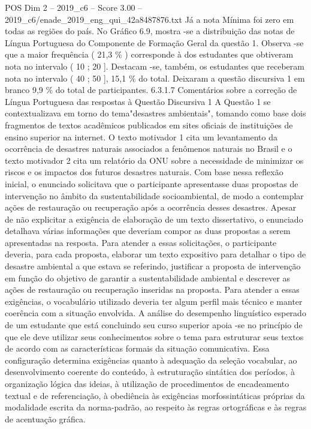 \begin{textsample}{POS Dim 2 – 2019\_c6 – Score 3.00 – 2019\_c6/enade\_2019\_eng\_qui\_42a8487876.txt}
Já a nota Mínima foi zero em todas as regiões do país.
No Gráfico 6.9, mostra -se a distribuição das notas de Língua Portuguesa do Componente de Formação Geral da questão 1.
Observa -se que a maior frequência ( 21,3 \% ) corresponde à dos estudantes que obtiveram nota no intervalo ( 10 ; 20 ].
Destacam -se, também, os estudantes que receberam nota no intervalo ( 40 ; 50 ], 15,1 \% do total.
Deixaram a questão discursiva 1 em branco 9,9 \% do total de participantes. 6.3.1.7 Comentários sobre a correção de Língua Portuguesa das respostas à Questão Discursiva 1 A Questão 1 se contextualizava em torno do tema"desastres ambientais", tomando como base dois fragmentos de textos acadêmicos publicados em sites oficiais de instituições de ensino superior na internet.
O texto motivador 1 cita um levantamento da ocorrência de desastres naturais associados a fenômenos naturais no Brasil e o texto motivador 2 cita um relatório da ONU sobre a necessidade de minimizar os riscos e os impactos dos futuros desastres naturais.
Com base nessa reflexão inicial, o enunciado solicitava que o participante apresentasse duas propostas de intervenção no âmbito da sustentabilidade socioambiental, de modo a contemplar ações de restauração ou recuperação após a ocorrência desses desastres.
Apesar de não explicitar a exigência de elaboração de um texto dissertativo, o enunciado detalhava várias informações que deveriam compor as duas propostas a serem apresentadas na resposta.
Para atender a essas solicitações, o participante deveria, para cada proposta, elaborar um texto expositivo para detalhar o tipo de desastre ambiental a que estava se referindo, justificar a proposta de intervenção em função do objetivo de garantir a sustentabilidade ambiental e descrever as ações de restauração ou recuperação inseridas na proposta.
Para atender a essas exigências, o vocabulário utilizado deveria ter algum perfil mais técnico e manter coerência com a situação envolvida.
A análise do desempenho linguístico esperado de um estudante que está concluindo seu curso superior apoia -se no princípio de que ele deve utilizar seus conhecimentos sobre o tema para estruturar seus textos de acordo com as características formais da situação comunicativa.
Essa configuração determina exigências quanto à adequação da seleção vocabular, ao desenvolvimento coerente do conteúdo, à estruturação sintática dos períodos, à organização lógica das ideias, à utilização de procedimentos de encadeamento textual e de referenciação, à obediência às exigências morfossintáticas próprias da modalidade escrita da norma-padrão, ao respeito às regras ortográficas e às regras de acentuação gráfica.

\end{textsample}
